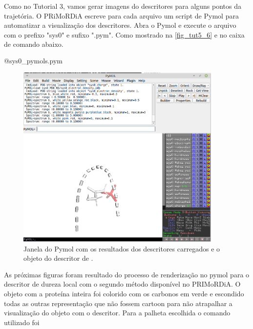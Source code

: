 \documentclass[a4paper,11pt]{refart}
\begin{document}
Como no Tutorial 3, vamos gerar imagens do descritores para alguns pontos da trajetória. O PRiMoRDiA escreve para cada arquivo um script de Pymol para automatizar a visualização dos descritores. Abra o Pymol e execute o arquivo com o prefixo "sys0" e sufixo ".pym". Como mostrado na \autoref{fig_tut5_6} e no caixa de comando abaixo. 

\hspace*{-\leftmarginwidth}
\begin{minipage}{\fullwidth}\begin{pymol}@sys0_pymols.pym\end{pymol}
\end{minipage}

\hspace*{-\leftmarginwidth}
\begin{minipage}{\fullwidth}
	\begin{figure}[H]
		\begin{center}
			\includegraphics[width=4in]{images/tut6_img8}
			\caption{Janela do Pymol com os resultados dos descritores carregados e o objeto do descritor de .}
			\label{fig_tut6_6}
		\end{center}
	\end{figure}
\end{minipage}

As próximas figuras foram resultado do processo de renderização no pymol para o descritor de dureza local com o segundo método disponível no PRIMoRDiA. O objeto com a proteína inteira foi colorido com os carbonos em verde e escondido todas as outras representação que não fossem cartoon para não atrapalhar a visualização do objeto com o descritor. Para a palheta escolhida o comando utilizado foi 
\end{document}
